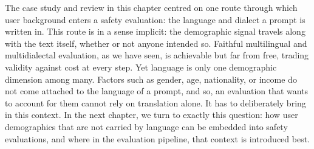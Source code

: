 The case study and review in this chapter centred on one route through which user background enters a safety evaluation: the language and dialect a prompt is written in. This route is in a sense implicit: the demographic signal travels along with the text itself, whether or not anyone intended so. Faithful multilingual and multidialectal evaluation, as we have seen, is achievable but far from free, trading validity against cost at every step. Yet language is only one demographic dimension among many. Factors such as gender, age, nationality, or income do not come attached to the language of a prompt, and so, an evaluation that wants to account for them cannot rely on translation alone. It has to deliberately bring in this context. In the next chapter, we turn to exactly this question: how user demographics that are not carried by language can be embedded into safety evaluations, and where in the evaluation pipeline, that context is introduced best.

